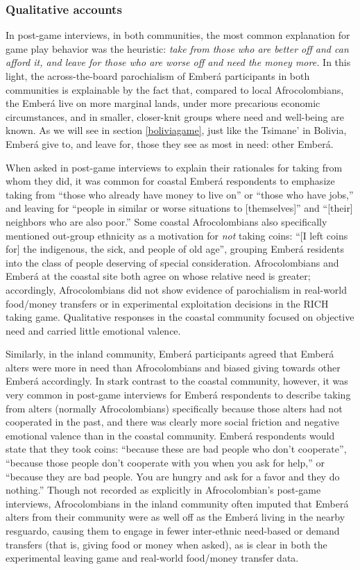 \documentclass[bibauthoryear]{aa}
\begin{document}
\subsubsection{Qualitative accounts}\label{qual}
In post-game interviews, in both communities, the most common explanation for game play behavior was the heuristic: \textit{take from those who are better off and can afford it, and leave for those who are worse off and  need the money more. } In this light, the across-the-board parochialism of Ember\'a participants in both communities is explainable by the fact that, compared to local Afrocolombians, the Ember\'a live on more marginal lands, under more precarious economic circumstances, and in smaller, closer-knit groups where need and well-being are known. As we will see in section \ref{boliviagame}, just like the Tsimane' in Bolivia, Ember\'a give to, and leave for, those they see as most in need: other Ember\'a.

When asked in post-game interviews to explain their rationales for taking from whom they did, it was common for coastal Ember\'a respondents to emphasize taking from ``those who already have money to live on'' or ``those who have jobs,'' and leaving for ``people  in similar or worse situations to [themselves]'' and ``[their] neighbors who are also poor.'' Some coastal Afrocolombians also specifically mentioned out-group ethnicity as a motivation for \textit{not} taking coins: ``[I left coins for] the indigenous, the sick, and people of old age'', grouping Ember\'a residents into the class of people deserving of special consideration. Afrocolombians and Ember\'a at the coastal site both agree on whose relative need is greater; accordingly, Afrocolombians did not show evidence of parochialism in real-world food/money transfers or in experimental exploitation decisions in the RICH taking game. Qualitative responses in the coastal community focused on objective need and carried little emotional valence.


Similarly, in the inland community, Ember\'a participants agreed that Ember\'a alters were more in need than Afrocolombians and biased giving towards other Ember\'a accordingly. In stark contrast to the coastal community, however, it was very common in post-game interviews for Ember\'a respondents to describe taking from alters (normally Afrocolombians) specifically because those alters had not cooperated in the past, and there was clearly more social friction and negative emotional valence than in the coastal community. Ember\'a respondents would state that they took coins: ``because these  are bad people  who don't cooperate'', ``because those people don't cooperate with you when you ask for help,'' or ``because they are bad people. You are hungry and ask for a favor and they do nothing.'' Though not recorded as explicitly in Afrocolombian's post-game interviews,  Afrocolombians in the inland community often imputed that Ember\'a alters from their community were as well off as the Ember\'a living in the nearby resguardo, causing them to engage in fewer inter-ethnic need-based or demand transfers (that is, giving food or money when asked), as is clear in both the experimental leaving game and real-world food/money transfer data.
\end{document}
